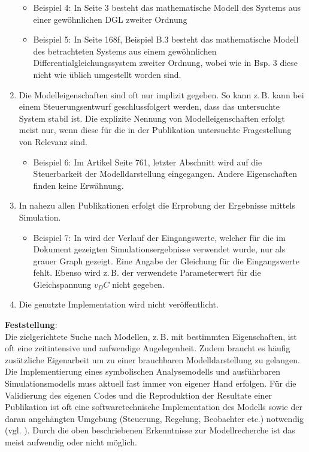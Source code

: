 \begin{enumerate}
\begin{itemize}[label=$\bullet$]
		\item Beispiel 4: In \cite{BUT21} Seite 3 besteht das mathematische Modell des Systems aus einer gewöhnlichen DGL zweiter Ordnung
		\item Beispiel 5: In \cite{KNO16} Seite 168f, Beispiel B.3 besteht das mathematische Modell des betrachteten Systems aus einem gewöhnlichen Differentialgleichungssystem zweiter Ordnung, wobei wie in Bsp. 3 diese nicht wie üblich umgestellt worden sind.
	\end{itemize}
	\item  Die Modelleigenschaften sind oft nur implizit gegeben. So kann z.\,B. kann bei einem Steuerungsentwurf geschlussfolgert werden, dass das untersuchte System stabil ist. Die explizite Nennung von Modelleigenschaften erfolgt meist nur, wenn diese für die in der Publikation untersuchte Fragestellung von Relevanz sind. 
	\begin{itemize}[label=$\bullet$]
		\item Beispiel 6: Im Artikel \cite{PEGUEA16} Seite 761, letzter Abschnitt wird auf die Steuerbarkeit der Modelldarstellung eingegangen. Andere Eigenschaften finden keine Erwähnung.
	\end{itemize}
	\item In nahezu allen Publikationen erfolgt die Erprobung der Ergebnisse mittels Simulation. 
	\begin{itemize}[label=$\bullet$]
		\item Beispiel 7: In \cite{BUT21} wird der Verlauf der Eingangswerte, welcher für die im Dokument gezeigten Simulationsergebnisse verwendet wurde, nur als grauer Graph gezeigt. Eine Angabe der Gleichung für die Eingangswerte fehlt. Ebenso wird z.\,B. der verwendete Parameterwert für die Gleichspannung $v_DC$ nicht gegeben.
	\end{itemize}
	\item Die genutzte Implementation wird nicht veröffentlicht.
\end{enumerate}

\textbf{Feststellung}:\\
Die zielgerichtete Suche nach Modellen, z.\,B. mit bestimmten Eigenschaften, ist oft eine zeitintensive und aufwendige Angelegenheit. Zudem braucht es häufig zusätzliche Eigenarbeit um zu einer brauchbaren Modelldarstellung zu gelangen. Die Implementierung eines symbolischen Analysemodells und ausführbaren Simulationsmodells muss aktuell fast immer von eigener Hand erfolgen. Für die Validierung des eigenen Codes und die Reproduktion der Resultate einer Publikation ist oft eine softwaretechnische Implementation des Modells sowie der daran angehängten Umgebung (Steuerung, Regelung, Beobachter etc.) notwendig (vgl. \cite[S. 1]{KNHE20b}). Durch die oben beschriebenen Erkenntnisse zur Modellrecherche ist das meist aufwendig oder nicht möglich.

